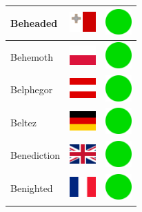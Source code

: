 \documentclass[12pt, a4paper, twoside]{report}
\begin{document}
\begin{center}
\begin{longtable}{|p{5cm}|p{2cm}|p{2cm}|}
Beheaded & \includegraphics[width=1cm]{4x3/mt} & \includegraphics[width=1cm]{likes/y} \\ \hline
Behemoth & \includegraphics[width=1cm]{4x3/pl} & \includegraphics[width=1cm]{likes/y} \\ \hline
Belphegor & \includegraphics[width=1cm]{4x3/at} & \includegraphics[width=1cm]{likes/y} \\ \hline
Beltez & \includegraphics[width=1cm]{4x3/de} & \includegraphics[width=1cm]{likes/y} \\ \hline
Benediction & \includegraphics[width=1cm]{4x3/gb} & \includegraphics[width=1cm]{likes/y} \\ \hline
Benighted & \includegraphics[width=1cm]{4x3/fr} & \includegraphics[width=1cm]{likes/y} \\ \hline

\end{longtable}
\end{center}
\end{document}
